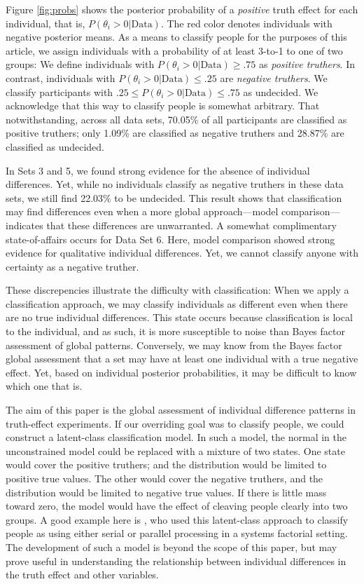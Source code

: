 \documentclass[
  english,
  ,man,floatsintext]{apa6}
\begin{document}
Figure \ref{fig:probs} shows the posterior probability of a \emph{positive} truth effect for each individual, that is, \(P(\theta_i > 0|\text{Data})\). The red color denotes individuals with negative posterior means. As a means to classify people for the purposes of this article, we assign individuals with a probability of at least 3-to-1 to one of two groups: We define individuals with \(P(\theta_i > 0|\text{Data}) \geq .75\) as \emph{positive truthers}. In contrast, individuals with \(P(\theta_i > 0|\text{Data}) \leq .25\) are \emph{negative truthers}. We classify participants with \(.25 \leq P(\theta_i > 0|\text{Data}) \leq .75\) as undecided. We acknowledge that this way to classify people is somewhat arbitrary. That notwithstanding, across all data sets, 70.05\% of all participants are classified as positive truthers; only 1.09\% are classified as negative truthers and 28.87\% are classified as undecided.

In Sets 3 and 5, we found strong evidence for the absence of individual differences. Yet, while no individuals classify as negative truthers in these data sets, we still find 22.03\% to be undecided. This result shows that classification may find differences even when a more global approach---model comparison---indicates that these differences are unwarranted. A somewhat complimentary state-of-affairs occurs for Data Set 6. Here, model comparison showed strong evidence for qualitative individual differences. Yet, we cannot classify anyone with certainty as a negative truther.

These discrepencies illustrate the difficulty with classification: When we apply a classification approach, we may classify individuals as different even when there are no true individual differences. This state occurs because classification is local to the individual, and as such, it is more susceptible to noise than Bayes factor assessment of global patterns. Conversely, we may know from the Bayes factor global assessment that a set may have at least one individual with a true negative effect. Yet, based on individual posterior probabilities, it may be difficult to know which one that is.

The aim of this paper is the global assessment of individual difference patterns in truth-effect experiments. If our overriding goal was to classify people, we could construct a latent-class classification model. In such a model, the normal in the unconstrained model could be replaced with a mixture of two states. One state would cover the positive truthers; and the distribution would be limited to positive true values. The other would cover the negative truthers, and the distribution would be limited to negative true values. If there is little mass toward zero, the model would have the effect of cleaving people clearly into two groups. A good example here is \textcite{houpt2017}, who used this latent-class approach to classify people as using either serial or parallel processing in a systems factorial setting. The development of such a model is beyond the scope of this paper, but may prove useful in understanding the relationship between individual differences in the truth effect and other variables.
\end{document}
